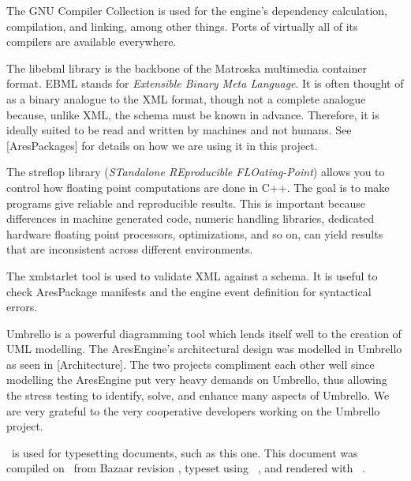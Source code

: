 
The GNU Compiler Collection is used for the engine's dependency calculation, compilation, and linking, among other things. Ports of virtually all of its compilers are available everywhere.


The libebml library is the backbone of the Matroska multimedia container format. EBML stands for {\it Extensible Binary Meta Language}. It is often thought of as a binary analogue to the XML format, though not a complete analogue because, unlike XML, the schema must be known in advance. Therefore, it is ideally suited to be read and written by machines and not humans. See [AresPackages] for details on how we are using it in this project.


The streflop library ({\it STandalone REproducible FLOating-Point}) allows you to control how floating point computations are done in C++. The goal is to make programs give reliable and reproducible results. This is important because differences in machine generated code, numeric handling libraries, dedicated hardware floating point processors, optimizations, and so on, can yield results that are inconsistent across different environments.


The xmlstarlet tool is used to validate XML against a schema. It is useful to check AresPackage manifests and the engine event definition for syntactical errors.


Umbrello is a powerful diagramming tool which lends itself well to the creation of UML modelling. The AresEngine's architectural design was modelled in Umbrello as seen in [Architecture]. The two projects compliment each other well since modelling the AresEngine put very heavy demands on Umbrello, thus allowing the stress testing to identify, solve, and enhance many aspects of Umbrello. We are very grateful to the very cooperative developers working on the Umbrello project.
\stopitemize



\startitemize[3]
\setupwhitespace[big]
\head {\it \CONTEXT}

\CONTEXT\ is used for typesetting documents, such as this one. This document was compiled on \currentdate\ from Bazaar revision \BazaarRevision, typeset using \CONTEXT\ \contextversion, and rendered with \texenginename\ \texengineversion.

